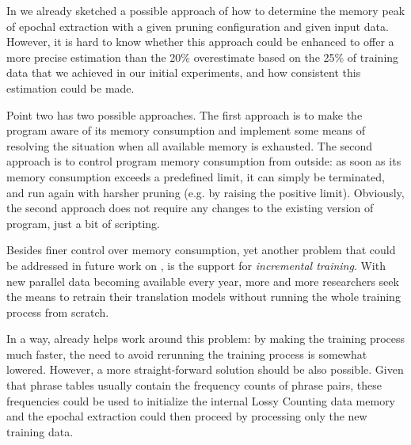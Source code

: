 In  we already sketched a possible approach of how to determine
the memory peak of epochal extraction with a given pruning configuration and given input data.
However, it is hard to know whether this approach could be enhanced to offer
a more precise estimation than the 20\% overestimate based on the 25\% of training
data that we achieved in our initial experiments, and how consistent this estimation
could be made.

Point two has two possible approaches.
The first approach is to make the program aware of its memory consumption and implement
some means of resolving the situation when all available memory is exhausted.
The second approach is to control program memory consumption from outside:
as soon as its memory consumption exceeds a predefined limit, it can simply be terminated, 
and run again with harsher pruning (e.g. by raising the positive limit).
Obviously, the second approach does not require any changes to the existing version of
program, just a bit of scripting.

Besides finer control over memory consumption, yet another problem that could
be addressed in future work on \eppex{}, is the support for \emph{incremental
training}.
With new parallel data becoming available every year, more and more researchers seek
the means to retrain their translation models without running the whole
training process from scratch.

In a way, \eppex{} already helps work around this problem: by making the training
process much faster, the need to avoid rerunning the training process is somewhat
lowered.
However, a more straight-forward solution should be also possible.
Given that phrase tables usually contain the frequency counts of phrase pairs,
these frequencies could be used to initialize the internal Lossy Counting data
memory and the epochal extraction could then proceed by processing only the new
training data.
